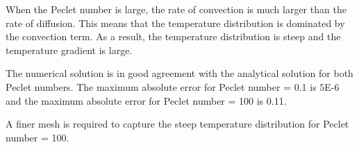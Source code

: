 When the Peclet number is large, the rate of convection is much larger than the rate of diffusion. This means that the temperature distribution is dominated by the convection term. As a result, the temperature distribution is steep and the temperature gradient is large. 

The numerical solution is in good agreement with the analytical solution for both Peclet numbers. The maximum absolute error for Peclet number = 0.1 is $5$E-6 and the maximum absolute error for Peclet number = 100 is 0.11. 

A finer mesh is required to capture the steep temperature distribution for Peclet number = 100.\\

